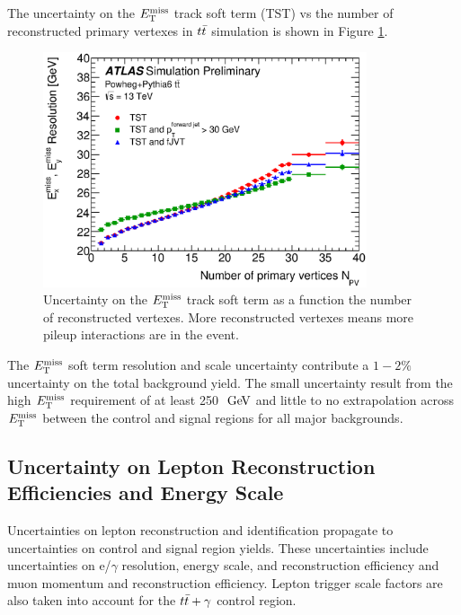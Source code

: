 \indent The uncertainty on the $\met$ track soft term (TST) vs the number of reconstructed primary vertexes in $t\bar{t}$ simulation is shown in Figure \ref{fig:sys:MET_TST_tt}. \\

\begin{figure}[!h]
\begin{center}
\includegraphics[width=0.85\textwidth]{figures/METCalib/MET_TST_tt.eps}
\caption[Uncertainty on the $\met$ track soft term as a function the number of reconstructed vertexes.]{Uncertainty on the $\met$ track soft term as a function the number of reconstructed vertexes.  More reconstructed vertexes means more pileup interactions are in the event. }
\label{fig:sys:MET_TST_tt}
\end{center}
\end{figure}

\indent The $\met$ soft term resolution and scale uncertainty contribute a $1-2\%$ uncertainty on the total background yield.  The small uncertainty result from the high $\met$ requirement of at least 250 $\gev$ and little to no extrapolation across $\met$ between the control and signal regions for all major backgrounds. \\

\subsection{Uncertainty on Lepton Reconstruction Efficiencies and Energy Scale}

\indent Uncertainties on lepton reconstruction and identification propagate to uncertainties on control and signal region yields.  These uncertainties include uncertainties on e/$\gamma$ resolution, energy scale, and reconstruction efficiency and muon momentum and reconstruction efficiency.  Lepton trigger scale factors are also taken into account for the $t\bar{t}+\gamma$ control region. \\

